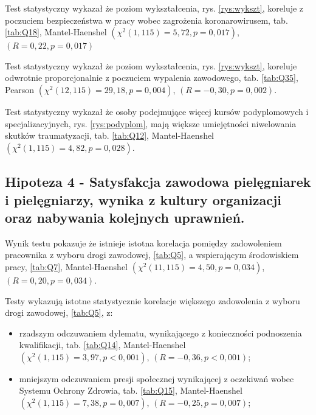\documentclass[a4paper,12pt,twoside,openright]{mwrep}
\begin{document}
	Test statystyczny wykazał że poziom wykształcenia, rys. \ref{rys:wykszt}, koreluje z poczuciem bezpieczeństwa w pracy wobec zagrożenia koronarowirusem, tab. \ref{tab:Q18}, Mantel-Haenshel $(\chi^2 (1, 115) = 5,72, p=0,017)$, $(R = 0,22, p = 0,017)$
	
	Test statystyczny wykazał że poziom wykształcenia, rys. \ref{rys:wykszt}, koreluje odwrotnie proporcjonalnie z poczuciem wypalenia zawodowego, tab. \ref{tab:Q35}, Pearson $(\chi^2 (12, 115) = 29,18, p=0,004)$, $(R = -0,30, p = 0,002)$. 
		
	Test statystyczny wykazał że osoby podejmujące więcej kursów podyplomowych i specjalizacyjnych, rys. \ref{rys:podyplom}, mają większe umiejętności niwelowania skutków traumatyzacji, tab. \ref{tab:Q12}, Mantel-Haenshel $(\chi^2 (1, 115) = 4,82, p=0,028)$. 


\vspace{\baselineskip} 

\subsection*{Hipoteza 4 - Satysfakcja zawodowa pielęgniarek i pielęgniarzy, wynika z kultury organizacji oraz nabywania kolejnych uprawnień.}




  
Wynik testu pokazuje że istnieje istotna korelacja pomiędzy zadowoleniem pracownika z wyboru drogi zawodowej, \ref{tab:Q5}, a wspierającym środowiskiem pracy, \ref{tab:Q7}, Mantel-Haenshel $(\chi^2 (11, 115) = 4,50, p=0,034)$, $(R = 0,20, p = 0,034)$.

Testy wykazują istotne statystycznie korelacje większego zadowolenia z wyboru drogi zawodowej, \ref{tab:Q5}, z:
	\begin{itemize}
		\item rzadszym odczuwaniem dylematu, wynikającego z konieczności podnoszenia kwalifikacji, tab. \ref{tab:Q14}, Mantel-Haenshel $(\chi^2 (1, 115) = 3,97, p < 0,001)$, $(R = -0,36, p < 0,001)$;
		\item mniejszym odczuwaniem presji społecznej wynikającej z oczekiwań wobec Systemu Ochrony Zdrowia, tab. \ref{tab:Q15}, Mantel-Haenshel $(\chi^2 (1, 115) = 7,38, p = 0,007)$, $(R = -0,25, p = 0,007)$;
	\end{itemize}
\end{document}
